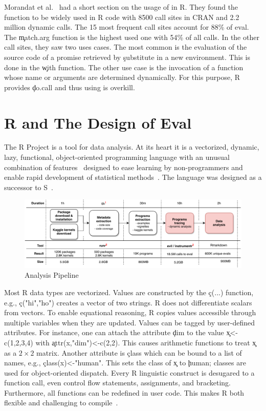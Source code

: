 \documentclass[conference]{IEEEtran}
\begin{document}
Morandat et al.~\cite{ecoop12} had a short section on the usage of \eval in
R. They found the \eval function to be widely used in R code with 8500 call
sites in CRAN and 2.2 million dynamic calls. The 15 most frequent call sites
account for 88\% of eval. The \c{match.arg} function is the highest used one
with 54\% of all calls. In the other call sites, they saw two uses
cases. The most common is the evaluation of the source code of a promise
retrieved by \c{substitute} in a new environment. This is done in the
\c{with} function. The other use case is the invocation of a function whose
name or arguments are determined dynamically. For this purpose, R provides
\c{do.call} and thus using \eval is overkill.

\section{R and The Design of Eval}

The R Project is a tool for data analysis.  At its heart it is a {vectorized,
  dynamic, lazy, functional, object-oriented} programming language with an
unusual combination of features~\cite{ecoop12} designed to ease learning by
non-programmers and enable rapid development of statistical
methods~\cite{R96}.  The language was designed as a successor to
S~\cite{S88}.

\begin{figure}[!t]\centering\includegraphics[width=.8\linewidth]
{pipeline.pdf}\caption{Analysis Pipeline}\label{fig:pipeline}
\end{figure}


Most R data types are vectorized. Values are constructed by the \c{c(...)}
function, e.g., \c{c("hi","ho")} creates a vector of two strings.  R does
not differentiate scalars from vectors. To enable equational reasoning, R
copies values accessible through multiple variables when they are updated.
Values can be tagged by user-defined attributes. For instance, one can
attach the attribute \c{dim} to the value \c{x<-c(1,2,3,4)} with
\c{attr(x,"dim")<-c(2,2)}.  This causes arithmetic functions to treat \c x
as a $2 \times 2$ matrix. Another attribute is \c{class} which can be bound to a list
of names, e.g., \c{class(x)<-"human"}. This sets the class of \c{x} to
\c{human}; classes are used for object-oriented dispatch.  Every R
linguistic construct is desugared to a function call, even control flow
statements, assignments, and bracketing. Furthermore, all functions can be
redefined in user code. This makes R both flexible and challenging to
compile~\cite{dls19}.
\end{document}
